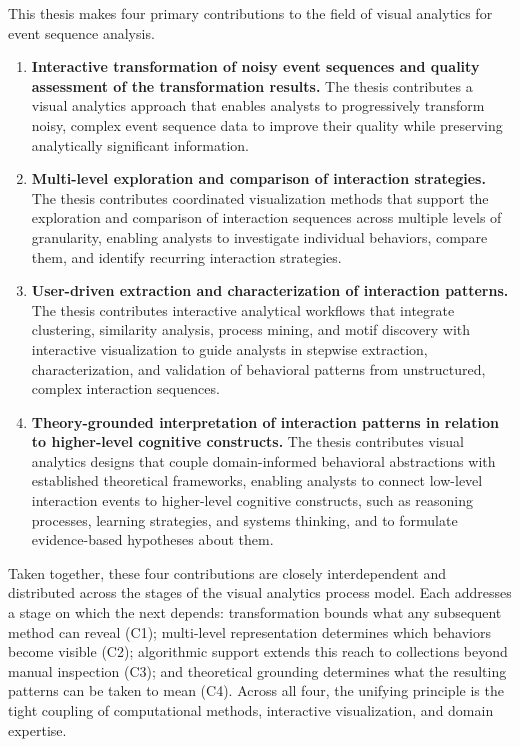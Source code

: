 This thesis makes four primary contributions to the field of visual analytics for event sequence analysis.

\begin{enumerate}
    \renewcommand{\labelenumi}{C\arabic{enumi}.}
    \item 
    \textbf{Interactive transformation of noisy event sequences and quality assessment of the transformation results.}
    The thesis contributes a visual analytics approach that enables analysts to progressively transform noisy, complex event sequence data to improve their quality while preserving analytically significant information.

    \item 
    \textbf{Multi-level exploration and comparison of interaction strategies.}
    The thesis contributes coordinated visualization methods that support the exploration and comparison of interaction sequences across multiple levels of granularity, enabling analysts to investigate individual behaviors, compare them, and identify recurring interaction strategies.

    \item 
    \textbf{User-driven extraction and characterization of interaction patterns.}
    The thesis contributes interactive analytical workflows that integrate clustering, similarity analysis, process mining, and motif discovery with interactive visualization to guide analysts in stepwise extraction, characterization, and validation of behavioral patterns from unstructured, complex interaction sequences.

    \item 
    \textbf{Theory-grounded interpretation of interaction patterns in relation to higher-level cognitive constructs.}
    The thesis contributes visual analytics designs that couple domain-informed behavioral abstractions with established theoretical frameworks, enabling analysts to connect low-level interaction events to higher-level cognitive constructs, such as reasoning processes, learning strategies, and systems thinking, and to formulate evidence-based hypotheses about them.
\end{enumerate}

Taken together, these four contributions are closely interdependent and distributed across the stages of the visual analytics process model.
Each addresses a stage on which the next depends: transformation bounds what any subsequent method can reveal (C1); multi-level representation determines which behaviors become visible (C2); algorithmic support extends this reach to collections beyond manual inspection (C3); and theoretical grounding determines what the resulting patterns can be taken to mean (C4).
Across all four, the unifying principle is the tight coupling of computational methods, interactive visualization, and domain expertise.





